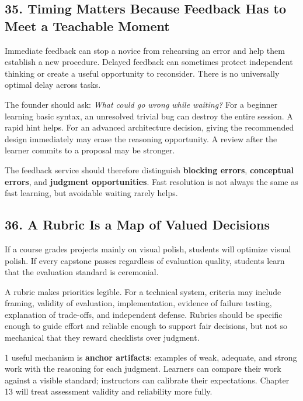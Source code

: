 \subsection*{35. Timing Matters Because Feedback Has to Meet a Teachable Moment}

Immediate feedback can stop a novice from rehearsing an error and help them establish a new procedure. Delayed feedback can sometimes protect independent thinking or create a useful opportunity to reconsider. There is no universally optimal delay across tasks.

The founder should ask: \emph{What could go wrong while waiting?} For a beginner learning basic syntax, an unresolved trivial bug can destroy the entire session. A rapid hint helps. For an advanced architecture decision, giving the recommended design immediately may erase the reasoning opportunity. A review after the learner commits to a proposal may be stronger.

The feedback service should therefore distinguish \textbf{blocking errors}, \textbf{conceptual errors}, and \textbf{judgment opportunities}. Fast resolution is not always the same as fast learning, but avoidable waiting rarely helps.

\subsection*{36. A Rubric Is a Map of Valued Decisions}

If a course grades projects mainly on visual polish, students will optimize visual polish. If every capstone passes regardless of evaluation quality, students learn that the evaluation standard is ceremonial.

A rubric makes priorities legible. For a technical system, criteria may include framing, validity of evaluation, implementation, evidence of failure testing, explanation of trade-offs, and independent defense. Rubrics should be specific enough to guide effort and reliable enough to support fair decisions, but not so mechanical that they reward checklists over judgment.

1 useful mechanism is \textbf{anchor artifacts}: examples of weak, adequate, and strong work with the reasoning for each judgment. Learners can compare their work against a visible standard; instructors can calibrate their expectations. Chapter 13 will treat assessment validity and reliability more fully.
